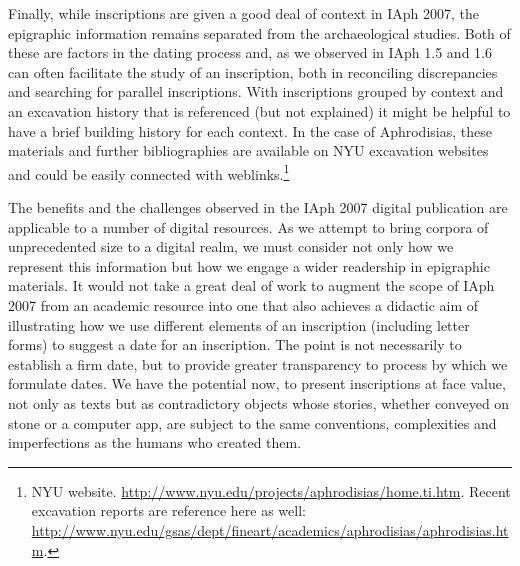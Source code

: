 \documentclass[amsthm,ebook]{saparticle}
\begin{document}
Finally, while inscriptions are given a good deal of context in IAph 2007, the epigraphic information remains
separated from the archaeological studies. Both of these are factors in the dating process and, as we observed in IAph
1.5 and 1.6 can often facilitate the study of an inscription, both in reconciling discrepancies and searching for
parallel inscriptions. With inscriptions grouped by context and an excavation history that is referenced (but not
explained) it might be helpful to have a brief building history for each context. In the case of Aphrodisias, these
materials and further bibliographies are available on NYU excavation websites and could be easily connected with
weblinks.\footnote{ NYU website. \url{http://www.nyu.edu/projects/aphrodisias/home.ti.htm}. Recent excavation reports are
reference here as well: \url{http://www.nyu.edu/gsas/dept/fineart/academics/aphrodisias/aphrodisias.htm}.}




The benefits and the challenges observed in the IAph 2007 digital publication are applicable to a number of digital
resources. As we attempt to bring corpora of unprecedented size to a digital realm, we must consider not only how we
represent this information but how we engage a wider readership in epigraphic materials. It would not take a great deal
of work to augment the scope of IAph 2007 from an academic resource into one that also achieves a didactic aim of
illustrating how we use different elements of an inscription (including letter forms) to suggest a date for an inscription. The point is not necessarily to establish a firm date, but to provide greater transparency to process by which we formulate dates. We have the potential now, to present inscriptions at
face value, not only as texts but as contradictory objects whose stories, whether conveyed on stone or a computer app,
are subject to the same conventions, complexities and imperfections as the humans who created them. 

\nocite{roueche2004} 
\nocite{buraselis2000}
\nocite{bruun2015}
\nocite{calabi1991}
\nocite{chaniotis2004}
\nocite{calder1962}
\nocite{panciera1995}



\end{document}

